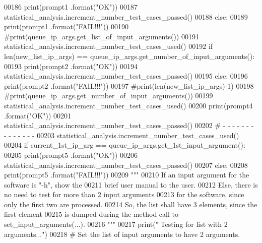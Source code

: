 \begin{DoxyCode}
00186             print(prompt1 .format(\textcolor{stringliteral}{"OK"}))
00187             statistical\_analysis.increment\_number\_test\_cases\_passed()
00188         \textcolor{keywordflow}{else}:
00189             print(prompt1 .format(\textcolor{stringliteral}{"FAIL!!!"}))
00190             \textcolor{comment}{#print(queue\_ip\_args.get\_list\_of\_input\_arguments())}
00191         statistical\_analysis.increment\_number\_test\_cases\_used()
00192         \textcolor{keywordflow}{if} len(new\_list\_ip\_args) == queue\_ip\_args.get\_number\_of\_input\_arguments():
00193             print(prompt2 .format(\textcolor{stringliteral}{"OK"}))
00194             statistical\_analysis.increment\_number\_test\_cases\_passed()
00195         \textcolor{keywordflow}{else}:
00196             print(prompt2 .format(\textcolor{stringliteral}{"FAIL!!!"}))
00197             \textcolor{comment}{#print(len(new\_list\_ip\_args)-1)}
00198             \textcolor{comment}{#print(queue\_ip\_args.get\_number\_of\_input\_arguments())}
00199         statistical\_analysis.increment\_number\_test\_cases\_used()
00200         print(prompt4 .format(\textcolor{stringliteral}{"OK"}))
00201         statistical\_analysis.increment\_number\_test\_cases\_passed()
00202         \textcolor{comment}{#   -   -   -   -   -   -   -   -   -   -   -   -   -   -}
00203         statistical\_analysis.increment\_number\_test\_cases\_used()
00204         \textcolor{keywordflow}{if} current\_1st\_ip\_arg == queue\_ip\_args.get\_1st\_input\_argument():
00205             print(prompt5 .format(\textcolor{stringliteral}{"OK"}))
00206             statistical\_analysis.increment\_number\_test\_cases\_passed()
00207         \textcolor{keywordflow}{else}:
00208             print(prompt5 .format(\textcolor{stringliteral}{"FAIL!!!"}))
00209         \textcolor{stringliteral}{"""}
00210 \textcolor{stringliteral}{            If an input argument for the software is "-h", show the}
00211 \textcolor{stringliteral}{                brief user manual to the user.}
00212 \textcolor{stringliteral}{            Else, there is no need to test for more than 2 input arguments}
00213 \textcolor{stringliteral}{                for the software, since only the first two are processed.}
00214 \textcolor{stringliteral}{            So, the list shall have 3 elements, since the first element}
00215 \textcolor{stringliteral}{                is dumped during the method call to set\_input\_arguments(...).}
00216 \textcolor{stringliteral}{        """}
00217         print(\textcolor{stringliteral}{" Testing for list with 2 arguments..."})
00218         \textcolor{comment}{#   Set the list of input arguments to have 2 arguments.}

\end{DoxyCode}
